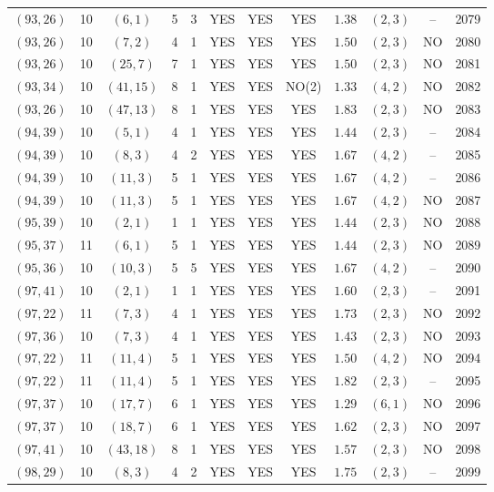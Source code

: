 \begin{longtable}{|c|c|c|c|c|c|c|c|c|c|c|c|}
$(93,26)$ & 10 & $(6,1)$ & 5 & 3 & YES & YES & YES & $1.38$ & $(2,3)$ & -- & 2079\\
$(93,26)$ & 10 & $(7,2)$ & 4 & 1 & YES & YES & YES & $1.50$ & $(2,3)$ & NO & 2080\\
$(93,26)$ & 10 & $(25,7)$ & 7 & 1 & YES & YES & YES & $1.50$ & $(2,3)$ & NO & 2081\\
$(93,34)$ & 10 & $(41,15)$ & 8 & 1 & YES & YES & NO(2) & $1.33$ & $(4,2)$ & NO & 2082\\
$(93,26)$ & 10 & $(47,13)$ & 8 & 1 & YES & YES & YES & $1.83$ & $(2,3)$ & NO & 2083\\
$(94,39)$ & 10 & $(5,1)$ & 4 & 1 & YES & YES & YES & $1.44$ & $(2,3)$ & -- & 2084\\
$(94,39)$ & 10 & $(8,3)$ & 4 & 2 & YES & YES & YES & $1.67$ & $(4,2)$ & -- & 2085\\
$(94,39)$ & 10 & $(11,3)$ & 5 & 1 & YES & YES & YES & $1.67$ & $(4,2)$ & -- & 2086\\
$(94,39)$ & 10 & $(11,3)$ & 5 & 1 & YES & YES & YES & $1.67$ & $(4,2)$ & NO & 2087\\
$(95,39)$ & 10 & $(2,1)$ & 1 & 1 & YES & YES & YES & $1.44$ & $(2,3)$ & NO & 2088\\
$(95,37)$ & 11 & $(6,1)$ & 5 & 1 & YES & YES & YES & $1.44$ & $(2,3)$ & NO & 2089\\
$(95,36)$ & 10 & $(10,3)$ & 5 & 5 & YES & YES & YES & $1.67$ & $(4,2)$ & -- & 2090\\
$(97,41)$ & 10 & $(2,1)$ & 1 & 1 & YES & YES & YES & $1.60$ & $(2,3)$ & -- & 2091\\
$(97,22)$ & 11 & $(7,3)$ & 4 & 1 & YES & YES & YES & $1.73$ & $(2,3)$ & NO & 2092\\
$(97,36)$ & 10 & $(7,3)$ & 4 & 1 & YES & YES & YES & $1.43$ & $(2,3)$ & NO & 2093\\
$(97,22)$ & 11 & $(11,4)$ & 5 & 1 & YES & YES & YES & $1.50$ & $(4,2)$ & NO & 2094\\
$(97,22)$ & 11 & $(11,4)$ & 5 & 1 & YES & YES & YES & $1.82$ & $(2,3)$ & -- & 2095\\
$(97,37)$ & 10 & $(17,7)$ & 6 & 1 & YES & YES & YES & $1.29$ & $(6,1)$ & NO & 2096\\
$(97,37)$ & 10 & $(18,7)$ & 6 & 1 & YES & YES & YES & $1.62$ & $(2,3)$ & NO & 2097\\
$(97,41)$ & 10 & $(43,18)$ & 8 & 1 & YES & YES & YES & $1.57$ & $(2,3)$ & NO & 2098\\
$(98,29)$ & 10 & $(8,3)$ & 4 & 2 & YES & YES & YES & $1.75$ & $(2,3)$ & -- & 2099\\

\end{longtable}
